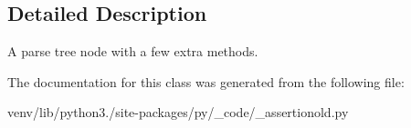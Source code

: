 \subsection{Detailed Description}
\begin{DoxyVerb}A parse tree node with a few extra methods.\end{DoxyVerb}
 

The documentation for this class was generated from the following file\+:\begin{DoxyCompactItemize}
\item 
venv/lib/python3./site-\/packages/py/\+\_\+code/\+\_\+assertionold.\+py\end{DoxyCompactItemize}
